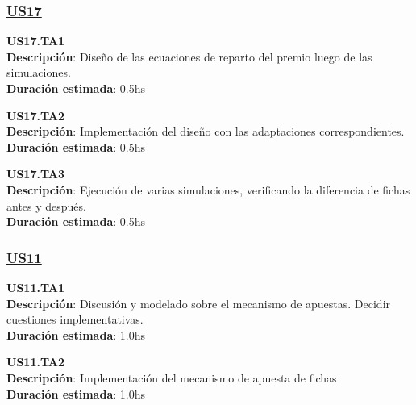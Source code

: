 \subsubsection*{\underline{US17}}

\begin{tcolorbox}
\textbf{US17.TA1} \\
\textbf{Descripción}: Diseño de las ecuaciones de reparto del premio luego de las simulaciones.\\ 
\textbf{Duración estimada}: 0.5hs
\end{tcolorbox}
\vspace{10pt}

\begin{tcolorbox}
\textbf{US17.TA2} \\
\textbf{Descripción}: Implementación del diseño con las adaptaciones correspondientes. \\
\textbf{Duración estimada}: 0.5hs
\end{tcolorbox}
\vspace{10pt}


\begin{tcolorbox}
\textbf{US17.TA3} \\
\textbf{Descripción}: Ejecución de varias simulaciones, verificando la diferencia de fichas antes y después. \\
\textbf{Duración estimada}: 0.5hs 
\end{tcolorbox}
\vspace{10pt}


\subsubsection*{\underline{US11}}

\begin{tcolorbox}
\textbf{US11.TA1} \\
\textbf{Descripción}: Discusión y modelado sobre el mecanismo de apuestas. Decidir cuestiones implementativas.\\
\textbf{Duración estimada}: 1.0hs
\end{tcolorbox}
\vspace{10pt}


\begin{tcolorbox}
\textbf{US11.TA2} \\
\textbf{Descripción}: Implementación del mecanismo de apuesta de fichas \\
\textbf{Duración estimada}: 1.0hs
\end{tcolorbox}
\vspace{10pt}



